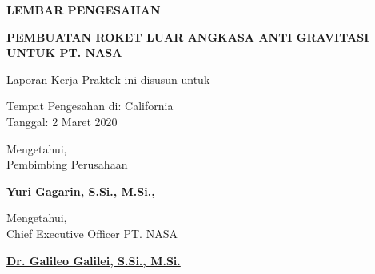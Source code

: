 \begin{center}
  {\Large \textbf{LEMBAR PENGESAHAN}}
  \vspace{6ex}

  {\large \textbf{PEMBUATAN ROKET LUAR ANGKASA ANTI GRAVITASI UNTUK PT. NASA}}
  \vspace{6ex}

  Laporan Kerja Praktek ini disusun untuk \lipsum[1][1]
  \vspace{2ex}

  Tempat Pengesahan di: California \\
  Tanggal: 2 Maret 2020
  \vspace{8ex}

  Mengetahui, \\
  Pembimbing Perusahaan
  \vspace{12ex}

  \textbf{\underline{Yuri Gagarin, S.Si., M.Si.,}}
  \vspace{8ex}

  Mengetahui, \\
  Chief Executive Officer PT. NASA
  \vspace{12ex}

  \textbf{\underline{Dr. Galileo Galilei, S.Si., M.Si.}}

\end{center}
